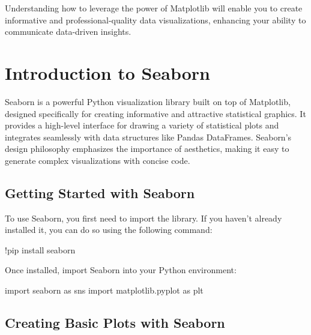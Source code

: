\documentclass[
  letterpaper,
  DIV=11,
  numbers=noendperiod]{scrreprt}
\newenvironment{Shaded}{\begin{snugshade}}{\end{snugshade}}
\newcommand{\ImportTok}[1]{\textcolor[rgb]{0.00,0.46,0.62}{#1}}
\newcommand{\NormalTok}[1]{\textcolor[rgb]{0.00,0.23,0.31}{#1}}
\newcommand{\OperatorTok}[1]{\textcolor[rgb]{0.37,0.37,0.37}{#1}}
\begin{document}
Understanding how to leverage the power of Matplotlib will enable you to
create informative and professional-quality data visualizations,
enhancing your ability to communicate data-driven insights.

\hypertarget{introduction-to-seaborn}{%
\section{Introduction to Seaborn}\label{introduction-to-seaborn}}

Seaborn is a powerful Python visualization library built on top of
Matplotlib, designed specifically for creating informative and
attractive statistical graphics. It provides a high-level interface for
drawing a variety of statistical plots and integrates seamlessly with
data structures like Pandas DataFrames. Seaborn's design philosophy
emphasizes the importance of aesthetics, making it easy to generate
complex visualizations with concise code.

\hypertarget{getting-started-with-seaborn}{%
\subsection{Getting Started with
Seaborn}\label{getting-started-with-seaborn}}

To use Seaborn, you first need to import the library. If you haven't
already installed it, you can do so using the following command:

\begin{Shaded}
\begin{Highlighting}[]
\OperatorTok{!}\NormalTok{pip install seaborn}
\end{Highlighting}
\end{Shaded}

Once installed, import Seaborn into your Python environment:

\begin{Shaded}
\begin{Highlighting}[]
\ImportTok{import}\NormalTok{ seaborn }\ImportTok{as}\NormalTok{ sns}
\ImportTok{import}\NormalTok{ matplotlib.pyplot }\ImportTok{as}\NormalTok{ plt}
\end{Highlighting}
\end{Shaded}

\hypertarget{creating-basic-plots-with-seaborn}{%
\subsection{Creating Basic Plots with
Seaborn}\label{creating-basic-plots-with-seaborn}}
\end{document}

